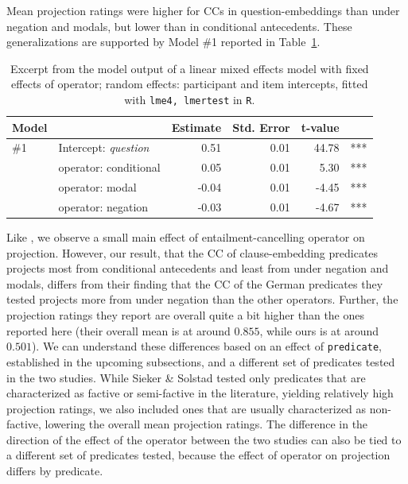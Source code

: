 \documentclass[a4paper,12pt,twoside]{article}
\begin{document}
			Mean projection ratings were higher for CCs in question-embeddings than under negation and modals, but lower than in conditional antecedents. These generalizations are supported by Model \#1 reported in Table~\ref{t:op-model}.

			\begin{table}[ht]
					\centering
					\hspace{-1.3em}
					\begin{tabular}{llrrrr}
						Model & & Estimate & Std. Error & t-value\\
						\midrule
						\#1 & Intercept: \emph{question} & 0.51 & 0.01 & 44.78 & ***\\
						& operator: conditional & 0.05 & 0.01 & 5.30 & ***\\
						& operator: modal & -0.04 & 0.01 & -4.45 & ***\\
						& operator: negation & -0.03 & 0.01 & -4.67 & ***\\
						\bottomrule
					\end{tabular}
				
					\caption{Excerpt from the model output of a linear mixed effects model with fixed effects of operator; random effects: participant and item intercepts, fitted with \texttt{lme4, lmertest} in \texttt{R}.\label{t:op-model}}
				\end{table}

			Like \citet{sieker_projective_2022}, we observe a small main effect of entailment-cancelling operator on projection. However, our result, that the CC of clause-embedding predicates projects most from conditional antecedents and least from under negation and modals, differs from their finding that the CC of the German predicates they tested projects more from under negation than the other operators. Further, the projection ratings they report are overall quite a bit higher than the ones reported here (their overall mean is at around $0.855$, while ours is at around $0.501$).
			We can understand these differences based on an effect of \texttt{predicate}, established in the upcoming subsections, and a different set of predicates tested in the two studies. While Sieker \& Solstad tested only predicates that are characterized as factive or semi-factive in the literature, yielding relatively high projection ratings, we also included ones that are usually characterized as non-factive, lowering the overall mean projection ratings. The difference in the direction of the effect of the operator between the two studies can also be tied to a different set of predicates tested, because the effect of operator on projection differs by predicate.
\end{document}
